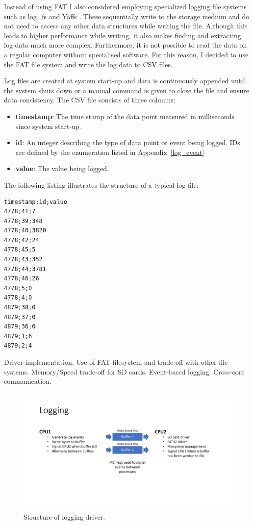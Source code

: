 Instead of using FAT I also considered employing specialized logging file systems such as log\_fs  and Yaffs . These sequentially write to the storage medium and do not need to access any other data structures while writing the file. Although this leads to higher performance while writing, it also makes finding and extracting log data much more complex. Furthermore, it is not possible to read the data on a regular computer without specialised software. For this reason, I decided to use the FAT file system and write the log data to CSV files.

Log files are created at system start-up and data is continuously appended until the system shuts down or a manual command is given to close the file and ensure data consistency. The CSV file consists of three columns:

\begin{itemize}
    \item \textbf{timestamp}: The time stamp of the data point measured in milliseconds since system start-up.
    \item \textbf{id}: An integer describing the type of data point or event being logged. IDs are defined by the enumeration listed in Appendix~\ref{log_event}
    \item \textbf{value}: The value being logged.
\end{itemize}

The following listing illustrates the structure of a typical log file:

\begin{verbatim}
timestamp;id;value
4778;41;7
4778;39;348
4778;40;3820
4778;42;24
4778;45;5
4778;43;352
4778;44;3781
4778;46;26
4778;5;0
4778;4;0
4879;38;0
4879;37;0
4879;36;0
4879;1;6
4879;2;4
\end{verbatim}

Driver implementation. Use of FAT filesystem and trade-off with other file systems. Memory/Speed trade-off for SD cards. Event-based logging. Cross-core communication.

\begin{figure}[H]
    \centering \includegraphics[width=1.0\textwidth]{./figures/logging_structure.pdf}
    \caption{Structure of logging driver.}
    \label{fig:logging_structure}
\end{figure}

